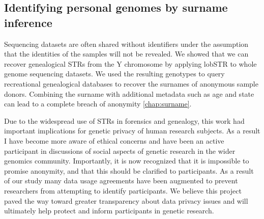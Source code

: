 \subsection{Identifying personal genomes by surname inference}
Sequencing datasets are often shared without identifiers under the assumption that the identities of the samples will not be revealed. We showed that we can recover genealogical STRs from the Y chromosome by applying lobSTR to whole genome sequencing datasets. We used the resulting genotypes to query recreational genealogical databases to recover the surnames of anonymous sample donors. Combining the surname with additional metadata such as age and state can lead to a complete breach of anonymity \cite{GymrekMcGuireGolanEtAl2013} \autoref{chap:surname}.

Due to the widespread use of STRs in forensics and genealogy, this work had important implications for genetic privacy of human research subjects. As a result I have become more aware of ethical concerns and have been an active participant in discussions of social aspects of genetic research in the wider genomics community. Importantly, it is now recognized that it is impossible to promise anonymity, and that this should be clarified to participants. As a result of our study many data usage agreements have been augmented to prevent researchers from attempting to identify participants. We believe this project paved the way toward greater transparency about data privacy issues and will ultimately help protect and inform participants in genetic research.
